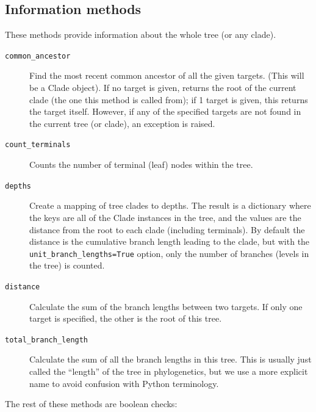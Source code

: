 \documentclass{report}
\begin{document}
\subsection{Information methods}

These methods provide information about the whole tree (or any clade).

\begin{description}
  \item[\texttt{common\_ancestor}]
    Find the most recent common ancestor of all the given targets. (This will be a Clade object). 
    If no target is given, returns the root of the current clade (the one this method is called
    from); if 1 target is given, this returns the target itself.  However, if any of the
    specified targets are not found in the current tree (or clade), an exception is raised.

  \item[\texttt{count\_terminals}]
    Counts the number of terminal (leaf) nodes within the tree.

  \item[\texttt{depths}]
    Create a mapping of tree clades to depths. The result is a dictionary where the keys are
    all of the Clade instances in the tree, and the values are the distance from the root to
    each clade (including terminals). By default the distance is the cumulative branch length
    leading to the clade, but with the \verb|unit_branch_lengths=True| option, only the number
    of branches (levels in the tree) is counted.

  \item[\texttt{distance}]
    Calculate the sum of the branch lengths between two targets.  If only one target is
    specified, the other is the root of this tree.

  \item[\texttt{total\_branch\_length}]
    Calculate the sum of all the branch lengths in this tree. This is usually just called the
    ``length'' of the tree in phylogenetics, but we use a more explicit name to avoid confusion
    with Python terminology.

\end{description}

The rest of these methods are boolean checks:
\end{document}
